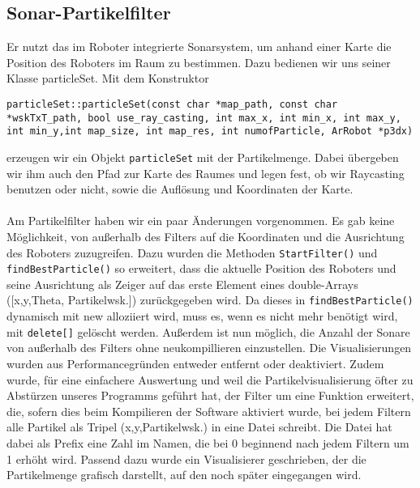 \subsection{Sonar-Partikelfilter}
\label{sec:sonarparticlefilter}
Er nutzt das im Roboter integrierte
Sonarsystem, um anhand einer Karte die Position des Roboters im Raum
zu bestimmen. Dazu bedienen wir uns seiner Klasse particleSet. 
Mit dem Konstruktor 
\begin{lstlisting}
particleSet::particleSet(const char *map_path, const char *wskTxT_path, bool use_ray_casting, int max_x, int min_x, int max_y, int min_y,int map_size, int map_res, int numofParticle, ArRobot *p3dx)
\end{lstlisting}
erzeugen wir ein Objekt
\lstinline|particleSet| mit der Partikelmenge. Dabei übergeben wir ihm auch den Pfad zur
Karte des Raumes und legen fest, ob wir Raycasting benutzen oder
nicht, sowie die Auflösung und Koordinaten der Karte.  \\\\
Am Partikelfilter haben wir ein paar Änderungen vorgenommen. Es gab keine
Möglichkeit, von außerhalb des Filters auf die Koordinaten und die
Ausrichtung des Roboters zuzugreifen. Dazu wurden die Methoden
\lstinline|StartFilter()|
und \lstinline|findBestParticle()| so erweitert, dass die aktuelle Position des Roboters
und seine Ausrichtung als Zeiger auf das erste Element eines double-Arrays
([x,y,Theta, Partikelwsk.]) zurückgegeben wird. Da dieses in
\lstinline|findBestParticle()| dynamisch mit new alloziiert wird, muss es, wenn es nicht
mehr benötigt wird, mit \lstinline|delete[]| gelöscht werden. Außerdem ist nun
möglich, 
die Anzahl der Sonare von außerhalb des Filters ohne neukompillieren
einzustellen. Die Visualisierungen wurden aus Performancegründen entweder
entfernt oder deaktiviert. Zudem wurde, für eine einfachere Auswertung und
weil die Partikelvisualisierung öfter zu Abstürzen unseres Programms
geführt hat, der Filter um eine Funktion erweitert, die, sofern dies
beim Kompilieren der Software aktiviert wurde,  bei jedem Filtern alle Partikel als
Tripel (x,y,Partikelwsk.) in eine Datei schreibt. Die Datei hat
dabei als Prefix eine Zahl im Namen, die bei 0 beginnend nach jedem Filtern
 um 1 erhöht wird. Passend dazu wurde ein Visualisierer geschrieben, der
die Partikelmenge grafisch darstellt, auf den noch später eingegangen
wird.

